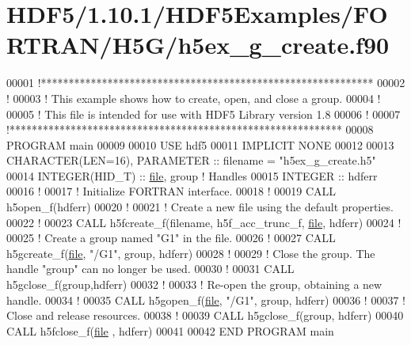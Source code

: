 \hypertarget{_h_d_f5_21_810_81_2_h_d_f5_examples_2_f_o_r_t_r_a_n_2_h5_g_2h5ex__g__create_8f90_source}{}\section{H\+D\+F5/1.10.1/\+H\+D\+F5\+Examples/\+F\+O\+R\+T\+R\+A\+N/\+H5\+G/h5ex\+\_\+g\+\_\+create.f90}
\label{_h_d_f5_21_810_81_2_h_d_f5_examples_2_f_o_r_t_r_a_n_2_h5_g_2h5ex__g__create_8f90_source}

\begin{DoxyCode}
00001 \textcolor{comment}{!************************************************************}
00002 \textcolor{comment}{!}
00003 \textcolor{comment}{!  This example shows how to create, open, and close a group.}
00004 \textcolor{comment}{!}
00005 \textcolor{comment}{!  This file is intended for use with HDF5 Library version 1.8}
00006 \textcolor{comment}{!}
00007 \textcolor{comment}{!************************************************************}
00008 \textcolor{keyword}{PROGRAM} main
00009 
00010   \textcolor{keywordtype}{USE }hdf5
00011   \textcolor{keywordtype}{IMPLICIT NONE}
00012 
00013   \textcolor{keywordtype}{CHARACTER(LEN=16)}, \textcolor{keywordtype}{PARAMETER} :: filename   = \textcolor{stringliteral}{"h5ex\_g\_create.h5"}
00014   \textcolor{keywordtype}{INTEGER(HID\_T)} :: \hyperlink{structfile}{file}, group \textcolor{comment}{! Handles}
00015   \textcolor{keywordtype}{INTEGER} :: hdferr
00016   \textcolor{comment}{!}
00017   \textcolor{comment}{! Initialize FORTRAN interface.}
00018   \textcolor{comment}{!}
00019   \textcolor{keyword}{CALL }h5open\_f(hdferr)
00020   \textcolor{comment}{!}
00021   \textcolor{comment}{! Create a new file using the default properties.}
00022   \textcolor{comment}{!}
00023   \textcolor{keyword}{CALL }h5fcreate\_f(filename, h5f\_acc\_trunc\_f, \hyperlink{structfile}{file}, hdferr)
00024   \textcolor{comment}{!}
00025   \textcolor{comment}{! Create a group named "G1" in the file.}
00026   \textcolor{comment}{!}
00027   \textcolor{keyword}{CALL }h5gcreate\_f(\hyperlink{structfile}{file}, \textcolor{stringliteral}{"/G1"}, group, hdferr)
00028   \textcolor{comment}{!}
00029   \textcolor{comment}{! Close the group.  The handle "group" can no longer be used.}
00030   \textcolor{comment}{!}
00031   \textcolor{keyword}{CALL }h5gclose\_f(group,hdferr)
00032   \textcolor{comment}{!}
00033   \textcolor{comment}{! Re-open the group, obtaining a new handle.}
00034   \textcolor{comment}{!}
00035   \textcolor{keyword}{CALL }h5gopen\_f(\hyperlink{structfile}{file}, \textcolor{stringliteral}{"/G1"}, group, hdferr)
00036   \textcolor{comment}{!}
00037   \textcolor{comment}{! Close and release resources.}
00038   \textcolor{comment}{!}
00039   \textcolor{keyword}{CALL }h5gclose\_f(group, hdferr)
00040   \textcolor{keyword}{CALL }h5fclose\_f(\hyperlink{structfile}{file} , hdferr)
00041 
00042 \textcolor{keyword}{END PROGRAM }main
\end{DoxyCode}
